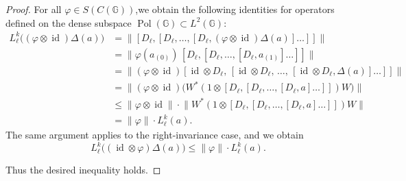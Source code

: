 \documentclass[10pt,a4paper]{amsart}
\begin{document}
\begin{proof}
 
For all \(\varphi \in S(C(\mathbb{G}))\),we  obtain the following identities for operators defined on the 
dense subspace \(\operatorname{Pol}(\mathbb{G}) \subset L^2(\mathbb{G})\):
\begin{align*}
L_\ell^k\bigl((\varphi \otimes \operatorname{id})\Delta(a)\bigr)
&= \bigl\| [D_\ell, [D_\ell, \dots, [D_\ell, 
   (\varphi \otimes \operatorname{id})\Delta(a)]\dots]] \bigr\| \\
&= \bigl\| \varphi(a_{(0)}) \, [D_\ell, [D_\ell, \dots, [D_\ell, a_{(1)}]\dots]] \bigr\| \\
&= \bigl\| (\varphi \otimes \operatorname{id}) 
   [\operatorname{id} \otimes D_\ell,\,
    [\operatorname{id} \otimes D_\ell,\,
     \dots,\,
    [\operatorname{id} \otimes D_\ell, \Delta(a)]\dots]] \bigr\| \\
&= \bigl\| (\varphi \otimes \operatorname{id}) 
   \bigl( W^* (1 \otimes [D_\ell, [D_\ell, \dots, [D_\ell, a]\dots]]) W \bigr) \bigr\| \\
&\le \|\varphi \otimes \operatorname{id}\| \cdot 
   \bigl\| W^* (1 \otimes [D_\ell, [D_\ell, \dots, [D_\ell, a]\dots]]) W \bigr\| \\
&= \|\varphi\| \cdot L_\ell^k(a).
\end{align*}
The same argument applies to the right-invariance case, and we obtain  \[L_\ell^k\bigl(( \operatorname{id}\otimes\varphi)\Delta(a)\bigr) 
\le \|\varphi\| \cdot L_\ell^k(a).\]

Thus the desired inequality holds.
\end{proof}
\end{document}
